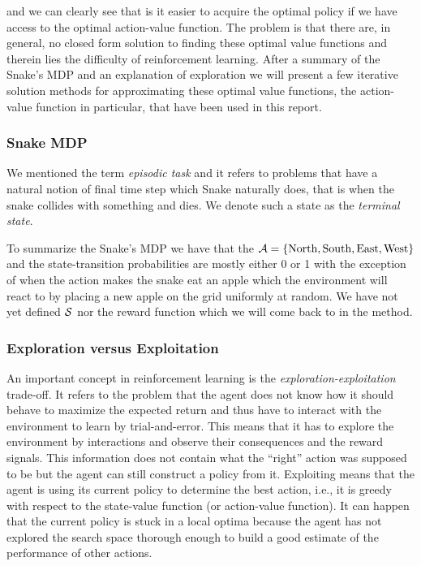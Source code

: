\documentclass[result.tex]{subfiles}
\begin{document}
    and we can clearly see that is it easier to acquire the optimal policy if we have access to the optimal action-value function. The problem is that there are, in general, no closed form solution to finding these optimal value functions and therein lies the difficulty of reinforcement learning. After a summary of the Snake's MDP and an explanation of exploration we will present a few iterative solution methods for approximating these optimal value functions, the action-value function in particular, that have been used in this report.

    \subsubsection*{Snake MDP}

    We mentioned the term \textit{episodic task} and it refers to problems that have a natural notion of final time step which Snake naturally does, that is when the snake collides with something and dies. We denote such a state as the \textit{terminal state}.

    To summarize the Snake's MDP we have that the $\mathcal{A} = \{ \text{North}, \text{South}, \text{East}, \text{West} \}$ and the state-transition probabilities are mostly either 0 or 1 with the exception of when the action makes the snake eat an apple which the environment will react to by placing a new apple on the grid uniformly at random. We have not yet defined $\mathcal{S}$ nor the reward function which we will come back to in the method.
    
    \subsubsection*{Exploration versus Exploitation}

    An important concept in reinforcement learning is the \textit{exploration-exploitation} trade-off. It refers to the problem that the agent does not know how it should behave to maximize the expected return and thus have to interact with the environment to learn by trial-and-error. This means that it has to explore the environment by interactions and observe their consequences and the reward signals. This information does not contain what the \enquote{right} action was supposed to be but the agent can still construct a policy from it. Exploiting means that the agent is using its current policy to determine the best action, i.e., it is greedy with respect to the state-value function (or action-value function). It can happen that the current policy is stuck in a local optima because the agent has not explored the search space thorough enough to build a good estimate of the performance of other actions.
\end{document}
